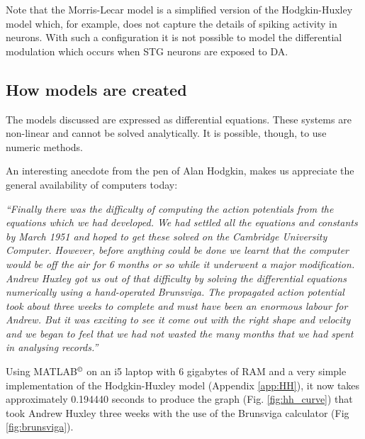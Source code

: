 Note that the Morris-Lecar model is a simplified version of the Hodgkin-Huxley model which, for example, does not capture the details of spiking activity in neurons.  With such a configuration it is not possible to model the differential modulation which occurs when \ac{STG} neurons are exposed to \ac{DA}.

\subsection{How models are created}
The models discussed are expressed as differential equations. These systems are non-linear and cannot be solved analytically. It is possible, though, to use numeric methods. 

An interesting anecdote from the pen of Alan Hodgkin, makes us appreciate the general availability of computers today:

\textit{``Finally there was the difficulty of computing the action potentials from the equations which we had developed. We had settled all the equations and constants by March 1951 and hoped to get these solved on the Cambridge University Computer. However, before anything could be done we learnt that the computer would be off the air for 6 months or so while it underwent a major modification. Andrew Huxley got us out of that difficulty by solving the differential equations numerically using a hand-operated Brunsviga. The propagated action potential took about three weeks to complete and must have been an enormous labour for Andrew. But it was exciting to see it come out with the right shape and velocity and we began to feel that we had not wasted the many months that we had spent in analysing records.''} \cite{Hodgkin1976}

Using MATLAB$^{\copyright}$ on an i5 laptop with 6 gigabytes of RAM and a very simple implementation of the Hodgkin-Huxley model (Appendix \ref{app:HH}), it now takes approximately 0.194440 seconds to produce the graph (Fig. \ref{fig:hh_curve}) that took Andrew Huxley three weeks with the use of the Brunsviga calculator (Fig \ref{fig:brunsviga}).


